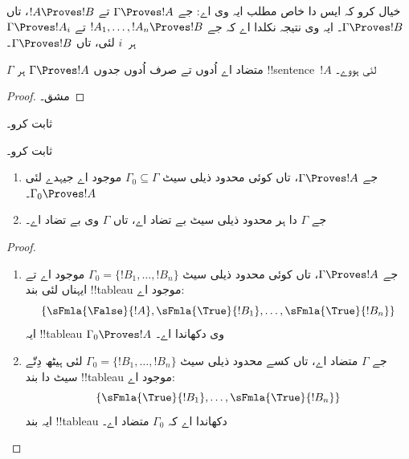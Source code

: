 \documentclass[../../../include/open-logic-section]{subfiles}
\begin{document}
خیال کرو کہ ایس دا خاص مطلب ایہ وی اے: جے $\Gamma \Proves !A$ تے $!A
\Proves !B$، تاں $\Gamma \Proves !B$۔ ایہ وی نتیجہ نکلدا اے کہ جے $!A_1,
\dots, !A_n \Proves !B$ تے $\Gamma \Proves !A_i$ ہر~$i$ لئی، تاں
$\Gamma \Proves !B$۔

\begin{prop}
$\Gamma$ متضاد اے اُدوں تے صرف اُدوں جدوں $\Gamma \Proves !A$
  ہر !!{sentence}~$!A$ لئی ہووے۔
\end{prop}

\begin{proof}
مشق۔
\end{proof}

\begin{prob}
 ثابت کرو۔
\end{prob}
\tagendprob

\begin{prob}
 ثابت کرو۔
\end{prob}
\tagendprob

\begin{prop}
  \begin{enumerate}
  \item جے $\Gamma \Proves !A$، تاں کوئی محدود ذیلی سیٹ $\Gamma_0
    \subseteq \Gamma$ موجود اے جیہدے لئی $\Gamma_0 \Proves !A$۔
  \item جے $\Gamma$ دا ہر محدود ذیلی سیٹ بے تضاد اے، تاں $\Gamma$
    وی بے تضاد اے۔
  \end{enumerate}
\end{prop}

\begin{proof}
  \begin{enumerate}
    \item جے $\Gamma \Proves !A$، تاں کوئی محدود ذیلی سیٹ
      $\Gamma_0 = \{!B_1, \dots, !B_n\}$ موجود اے تے ایہناں لئی بند !!{tableau}
      موجود اے:
      \[
      \{\sFmla{\False}{!A}, \sFmla{\True}{!B_1}, \dots, \sFmla{\True}{!B_n}\}
      \]
      ایہ !!{tableau} $\Gamma_0 \Proves !A$ وی دکھاندا اے۔
    \item جے $\Gamma$ متضاد اے، تاں کسے محدود ذیلی سیٹ
      $\Gamma_0 = \{!B_1, \dots, !B_n\}$ لئی ہیٹھ دِتّے سیٹ دا بند
      !!{tableau} موجود اے:
      \[
      \{\sFmla{\True}{!B_1}, \dots, \sFmla{\True}{!B_n}\}
      \]
      ایہ بند !!{tableau} دکھاندا اے کہ $\Gamma_0$ متضاد اے۔
  \end{enumerate}
\end{proof}
\end{document}
